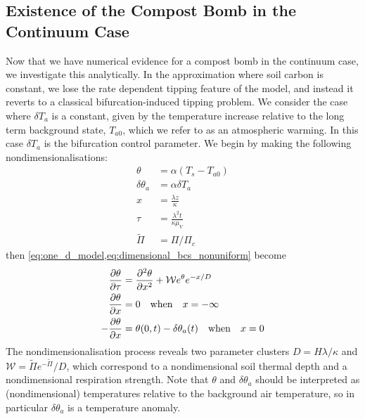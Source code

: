 \subsection{Existence of the Compost Bomb in the Continuum Case}
\label{sec:existence_of_compost_bomb}
Now that we have numerical evidence for a compost bomb in the continuum case, we investigate this analytically. In the approximation where soil carbon is constant,
we lose the rate dependent tipping feature of the model, and instead it reverts to a classical bifurcation-induced tipping problem.
We consider the case where $\delta T_a$ is a constant, given by the temperature increase relative to the long term background state, $T_{a0}$, which we refer to as an atmospheric warming.
In this case $\delta T_a$ is the bifurcation control parameter.
We begin by making the following nondimensionalisations:
\begin{subequations}
  \label{eq:nondimensionalisations}
  \begin{align}
    \theta &= \alpha\left(T_s - T_{a0}\right) \label{subeq:nondimensionalisations_soil_temperature}\\
    \delta\theta_a &= \alpha \delta T_a \label{subeq:nondimensionalisations_air_temperature}\\
    x &= \frac{\lambda z}{\kappa}  \label{subeq:nondimensionalisations_depth}\\
    \tau &= \frac{\lambda^2 t}{\kappa\mu_V} \label{subeq:nondimensionalisations_time}\\
    \widetilde{\Pi} &= \Pi/\Pi_c \label{subeq:nondimensionalisations_npp}
  \end{align}
\end{subequations}
then \cref{eq:one_d_model,eq:dimensional_bcs_nonuniform} become
\begin{subequations}
  \label{eq:nondimensional_model_nonuniform}
  \begin{align}
  \pdv{\theta}{\tau} &= \pdv[2]{\theta}{x} + \mathcal{W} e^{\theta}e^{-x/D} \label{subeq:nondimensional_model_nonuniform_reaction_diffusion}\\
  \pdv{\theta}{x} &= 0\quad \mathrm{when} \quad x=-\infty \label{subeq:nondimensional_model_nonuniform_bcs_upper}\\
  -\pdv{\theta}{x} &= \theta(0,t) - \delta\theta_a(t) \quad \mathrm{when} \quad x=0             \label{subeq:nondimensional_model_nonuniform_bcs_lower}
  \end{align}
\end{subequations}
The nondimensionalisation process reveals two parameter clusters $D = H\lambda/\kappa$ and $\mathcal{W} = \widetilde{\Pi}e^{-\widetilde{\Pi}}/D$, which
correspond to a nondimensional soil thermal depth and a nondimensional respiration strength. Note that $\theta$ and $\delta\theta_a$ should be interpreted as (nondimensional) temperatures
relative to the background air temperature, so in particular $\delta\theta_a$ is a temperature anomaly.

